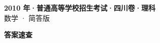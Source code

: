 \documentclass[zihao=-4, a4paper]{ctexart}
\begin{document}
\begin{center}
  {\Large\bfseries 2010 年·普通高等学校招生考试·四川卷·理科}\\[4pt]
  {\large 数学 · 简答版}
\end{center}
\medskip
{}

\clearpage
{}
\begin{center}{\Large\bfseries 答案速查}\end{center}
\medskip

\end{document}
